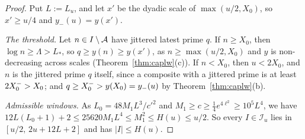 \begin{proof}
Put $L:=L_u$, and let $x'$ be the dyadic scale of $\max(u/2,X_0)$, so $x'\ge u/4$ and $y_-(u)=y(x')$.

\emph{The threshold.} Let $n\in I\setminus\mathcal{A}$ have jittered latest prime $q$. If $n\ge X_0$, then $\log n\ge\Lambda>L_*$, so
$q\ge y(n)\ge y(x')$, as $n\ge\max(u/2,X_0)$ and $y$ is non-decreasing across scales (Theorem~\ref{thm:caplw}(c)). If $n<X_0$,
then $u<2X_0$, and $n$ is the jittered prime $q$ itself, since a composite with a jittered prime is at least $2X_0^{-}>X_0$; and
$q\ge X_0^{-}>y(X_0)=y_-(u)$ by Theorem~\ref{thm:caplw}(b).

\emph{Admissible windows.} As $L_0=48M_1L^3/c'^2$ and $M_1\ge c\ge\frac14e^{4\ell^2}\ge10^5L^4$, we have
$12L(L_0+1)+2\le25620M_1L^4\le M_1^2\le H(u)\le u/2$. So every $I\in\mathcal I_u$ lies in $[u/2,\,2u+12L+2]$ and has
$|I|\le H(u)$.


\end{proof}
